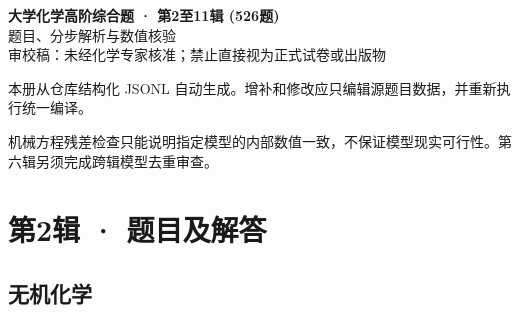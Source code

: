 \documentclass[UTF8,11pt,a4paper]{ctexart}
\begin{document}
\begin{center}
{\LARGE\bfseries 大学化学高阶综合题 · 第2至11辑 (526题)}\\[0.8em]
{\large 题目、分步解析与数值核验}\\[0.5em]
{\small \textcolor{red!65!black}{审校稿：未经化学专家核准；禁止直接视为正式试卷或出版物}}
\end{center}
\vspace{1em}
\noindent 本册从仓库结构化 JSONL 自动生成。增补和修改应只编辑源题目数据，并重新执行统一编译。
\par 机械方程残差检查只能说明指定模型的内部数值一致，不保证模型现实可行性。第六辑另须完成跨辑模型去重审查。
\tableofcontents
\clearpage
\section*{第2辑 · 题目及解答}
\subsection*{无机化学}
\end{document}
